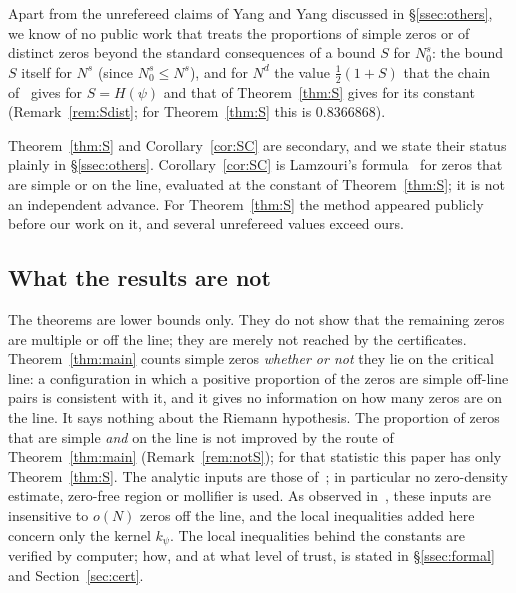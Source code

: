 Apart from the unrefereed claims of Yang and Yang discussed in \S\ref{ssec:others}, we know of no public work that treats the proportions
of simple zeros or of distinct zeros beyond the standard consequences of a bound $S$ for $N_0^s$: the bound $S$ itself for $N^s$ (since
$N_0^s\le N^s$), and for $N^d$ the value $\frac12(1+S)$ that the chain of~\cite[Theorem~A(ii)]{AF} gives for $S=H(\psi)$ and that of
Theorem~\ref{thm:S} gives for its constant (Remark~\ref{rem:Sdist}; for Theorem~\ref{thm:S} this is $0.8366868$).

Theorem~\ref{thm:S} and Corollary~\ref{cor:SC} are secondary, and we state their status plainly in \S\ref{ssec:others}. Corollary~\ref{cor:SC} is
Lamzouri's formula~\cite{Lamzouri} for zeros that are simple or on the line, evaluated at the constant of Theorem~\ref{thm:S}; it is not an
independent advance. For Theorem~\ref{thm:S} the method appeared publicly before our work on it, and several unrefereed values exceed ours.

\subsection{What the results are not}\label{ssec:not}
The theorems are lower bounds only. They do not show that the remaining zeros are multiple or off the line; they are merely not reached by the
certificates. Theorem~\ref{thm:main} counts simple zeros \emph{whether or not} they lie on the critical line: a configuration in which a
positive proportion of the zeros are simple off-line pairs is consistent with it, and it gives no information on how many zeros are on the
line. It says nothing about the Riemann hypothesis. The proportion of zeros that are simple \emph{and} on the line is not improved by the route
of Theorem~\ref{thm:main} (Remark~\ref{rem:notS}); for that statistic this paper has only Theorem~\ref{thm:S}. The analytic inputs are those
of~\cite{AF}; in particular no zero-density estimate, zero-free region or mollifier is used. As observed in~\cite[\S1.4]{AF}, these inputs
are insensitive to $o(N)$ zeros off the line, and the local inequalities added here concern only the kernel $k_\psi$. The local inequalities behind the constants are
verified by computer; how, and at what level of trust, is stated in \S\ref{ssec:formal} and Section~\ref{sec:cert}.


